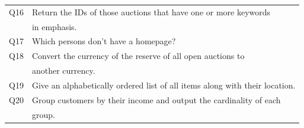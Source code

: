 \begin {table}[htpb]
\begin{tabular}{r|l}
	\hline
	Q16&Return the IDs of those auctions that have one or more keywords\\
	&in emphasis.\\
	\hline
	Q17&Which persons don't have a homepage?\\
	\hline
	Q18&Convert the currency of the reserve of all open auctions to\\
	&another currency.\\
	\hline
	Q19&Give an alphabetically ordered list of all items along with their location.\\
	\hline
	Q20&Group customers by their income and output the cardinality of each\\
	&group.\\
	\hline
\end{tabular}
\end {table}
